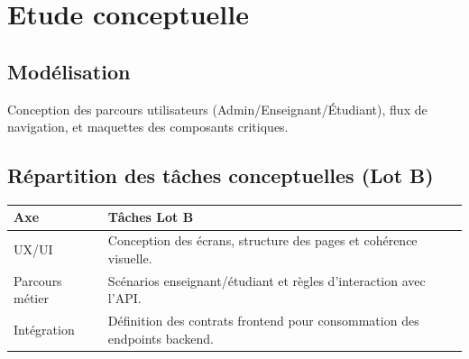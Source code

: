 \chapter{Etude conceptuelle}

\section*{Modélisation}
Conception des parcours utilisateurs (Admin/Enseignant/Étudiant), flux de navigation, et maquettes des composants critiques.

\section*{Répartition des tâches conceptuelles (Lot B)}
\begin{tabularx}{\textwidth}{lX}
\toprule
\textbf{Axe} & \textbf{Tâches Lot B} \\
\midrule
UX/UI & Conception des écrans, structure des pages et cohérence visuelle. \\
Parcours métier & Scénarios enseignant/étudiant et règles d'interaction avec l'API. \\
Intégration & Définition des contrats frontend pour consommation des endpoints backend. \\
\bottomrule
\end{tabularx}
